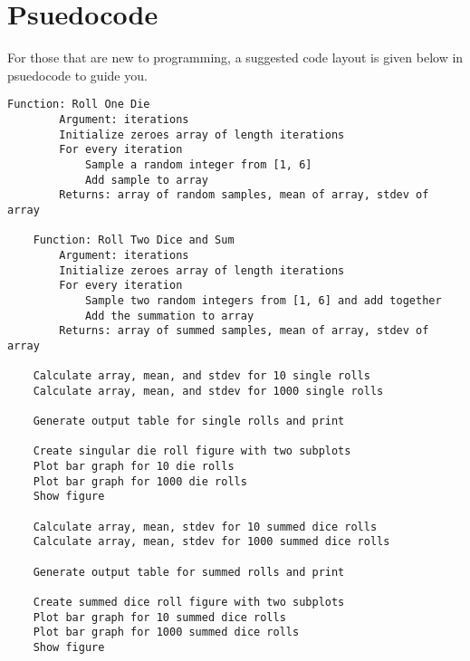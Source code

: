 \documentclass[
	letterpaper, %
	fontsize=10pt, %
	twoside=true, %
	numbers=noenddot, %
]{kaobook}
\begin{document}
\section*{Psuedocode}
For those that are new to programming, a suggested code layout is given below in psuedocode to guide you.

\begin{lstlisting}[style=kaolstplain, linewidth=1.5\textwidth]    
    Function: Roll One Die
        Argument: iterations
        Initialize zeroes array of length iterations
        For every iteration
            Sample a random integer from [1, 6]
            Add sample to array
        Returns: array of random samples, mean of array, stdev of array
    
    Function: Roll Two Dice and Sum
        Argument: iterations
        Initialize zeroes array of length iterations
        For every iteration
            Sample two random integers from [1, 6] and add together
            Add the summation to array
        Returns: array of summed samples, mean of array, stdev of array

    Calculate array, mean, and stdev for 10 single rolls
    Calculate array, mean, and stdev for 1000 single rolls

    Generate output table for single rolls and print

    Create singular die roll figure with two subplots
    Plot bar graph for 10 die rolls
    Plot bar graph for 1000 die rolls
    Show figure

    Calculate array, mean, stdev for 10 summed dice rolls
    Calculate array, mean, stdev for 1000 summed dice rolls

    Generate output table for summed rolls and print

    Create summed dice roll figure with two subplots
    Plot bar graph for 10 summed dice rolls
    Plot bar graph for 1000 summed dice rolls
    Show figure
    
    \end{lstlisting}
\end{document}

